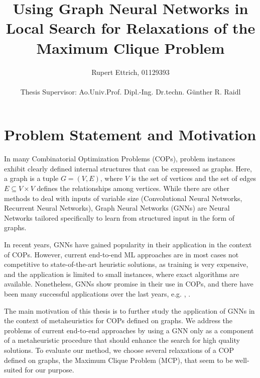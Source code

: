 \documentclass [11pt]{article}
\title{Using Graph Neural Networks in Local Search for Relaxations of the Maximum Clique Problem}
\author{Rupert Ettrich, 01129393 \\\\ Thesis Supervisor: Ao.Univ.Prof. Dipl.-Ing. Dr.techn. Günther R. Raidl}
\date{}
\begin{document}
	
\maketitle 
 
\section{Problem Statement and Motivation}

In many Combinatorial Optimization Problems (COPs), problem instances exhibit clearly defined internal structures that can be expressed as graphs. Here, a graph is a tuple $G = (V, E)$, where $V$ is the set of vertices and the set of edges $E \subseteq V \times V$ defines the relationships among vertices. While there are other methods to deal with inputs of variable size (Convolutional Neural Networks, Recurrent Neural Networks), Graph Neural Networks (GNNs) are Neural Networks tailored specifically to learn from structured input in the form of graphs. 

In recent years, GNNs have gained popularity in their application in the context of COPs. However, current end-to-end ML approaches are in most cases not competitive to state-of-the-art heuristic solutions, as training is very expensive, and the application is limited to small instances, where exact algorithms are available. Nonetheless, GNNs show promise in their use in COPs, and there have been many successful applications over the last years, e.g. \cite{NEURIPS2021_0db2e204}, \cite{Oberweger2022}. 

The main motivation of this thesis is to further study the application of GNNs in the context of metaheuristics for COPs defined on graphs. We address the problems of current end-to-end approaches by using a GNN only as a component of a metaheuristic procedure that should enhance the search for high quality solutions. To evaluate our method, we choose several relaxations of a COP defined on graphs, the Maximum Clique Problem (MCP), that seem to be well-suited for our purpose. 
\end{document}
